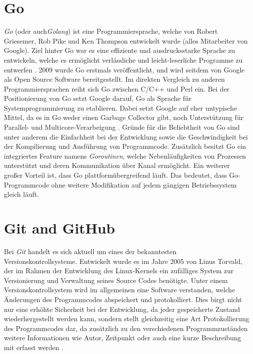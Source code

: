 \section{Go}
\textit{Go} (oder auch\textit{Golang}) ist eine Programmiersprache, welche von
Robert Griesemer, Rob Pike und Ken Thompson entwickelt wurde (alles Mitarbeiter
von Google). Ziel hinter Go war es eine effiziente und ausdrucksstarke Sprache
zu entwickeln, welche es ermöglicht verlässliche und
leicht-leserliche Programme zu entwerfen \autocite{donovan_kernighan_2016}.
2009 wurde Go erstmals veröffentlicht, und wird seitdem von Google als Open Source
Software bereitgestellt. \newline
Im direkten Vergleich zu anderen Programmiersprachen reiht sich Go zwischen
C/C++ und Perl ein. Bei der Positionierung von Go setzt Google darauf, Go als
Sprache für Systemprogrammierung zu etablieren. Dabei setzt Google auf eher
untypische Mittel, da es in Go weder einen Garbage Collector gibt, noch
Unterstützung für Parallel- und Multicore-Verarbeigung
\autocite{feike_blass_2012}. \newline 
Gründe für die Beliebtheit von Go sind unter anderem die Einfachheit bei der
Entwicklung sowie die Geschwindigkeit bei der Kompilierung und
Ausführung von Programmcode. Zusätzlich besitzt Go ein integriertes Feature namens
\textit{Goroutinen}, welche Nebenläufigkeiten von Prozessen unterstützt und
deren Kommunikation über Kanal ermöglicht. 
Ein weiterer großer Vorteil ist, dass Go plattformübergreifend läuft. Das bedeutet,
dass Go-Programmcode ohne weitere Modifikation auf jedem gängigen Betriebssystem gleich
läuft.
\autocite{donovan_kernighan_2016}


\section{Git and GitHub}
Bei \textit{Git} handelt es sich aktuell um eines der bekanntesten
Versionskontrollsysteme. Entwickelt wurde es im Jahre 2005 von Linus Torvald,
der im Rahmen der Entwicklung des Linux-Kernels ein zufälliges System zur
Versionierung und Verwaltung seines Source Codes benötigte. Unter einem
Versionskontrollsystem wird im allgemeinen eine Software verstanden, welche
Änderungen des Programmcodes abspeichert und protokolliert. Dies birgt nicht nur
eine erhöhte Sicherheit bei der Entwicklung, da jeder gespeicherte Zustand
wiederhergestellt werden kann, sondern stellt gleichzeitig eine Art
Protokollierung des Programmcodes dar, da zusätzlich zu den verschiedenen
Programmzuständen weitere Informationen wie Autor, Zeitpunkt oder auch eine
kurze Beschreibung mit erfasst werden \autocite{preissel_stachmann_2017}. \hfill
\break 

